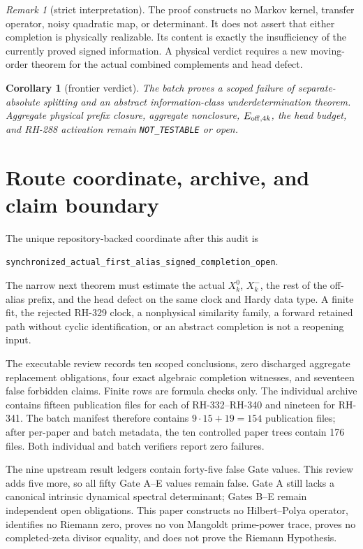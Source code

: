 \documentclass[11pt]{article}
\newtheorem{corollary}[theorem]{Corollary}
\theoremstyle{remark}
\newtheorem{remark}[theorem]{Remark}
\begin{document}
\begin{remark}[strict interpretation]
The proof constructs no Markov kernel, transfer operator, noisy quadratic
map, or determinant.  It does not assert that either completion is
physically realizable.  Its content is exactly the insufficiency of the
currently proved signed information.  A physical verdict requires a new
moving-order theorem for the actual combined complements and head defect.
\end{remark}

\begin{corollary}[frontier verdict]
The batch proves a scoped failure of separate-absolute splitting and an
abstract information-class underdetermination theorem.  Aggregate physical
prefix closure, aggregate nonclosure, $E_{{\rm off},4k}$, the head budget,
and RH-288 activation remain \texttt{NOT\_TESTABLE} or open.
\end{corollary}

\section{Route coordinate, archive, and claim boundary}

The unique repository-backed coordinate after this audit is
\begin{center}
\texttt{synchronized\_actual\_first\_alias\_signed\_completion\_open}.
\end{center}
The narrow next theorem must estimate the actual $X_k^0$, $X_k^-$, the rest
of the off-alias prefix, and the head defect on the same clock and Hardy data
type.  A finite fit, the rejected RH-329 clock, a nonphysical similarity
family, a forward retained path without cyclic identification, or an abstract
completion is not a reopening input.

The executable review records ten scoped conclusions, zero discharged
aggregate replacement obligations, four exact algebraic completion
witnesses, and seventeen false forbidden claims.  Finite rows are formula
checks only.  The individual archive contains fifteen publication files for
each of RH-332--RH-340 and nineteen for RH-341.  The batch manifest therefore
contains $9\cdot15+19=154$ publication files; after per-paper and batch
metadata, the ten controlled paper trees contain 176 files.  Both individual
and batch verifiers report zero failures.

The nine upstream result ledgers contain forty-five false Gate values.  This
review adds five more, so all fifty Gate A--E values remain false.  Gate A
still lacks a canonical intrinsic dynamical spectral determinant; Gates
B--E remain independent open obligations.  This paper constructs no
Hilbert--Polya operator, identifies no Riemann zero, proves no von Mangoldt
prime-power trace, proves no completed-zeta divisor equality, and does not
prove the Riemann Hypothesis.



\end{document}
